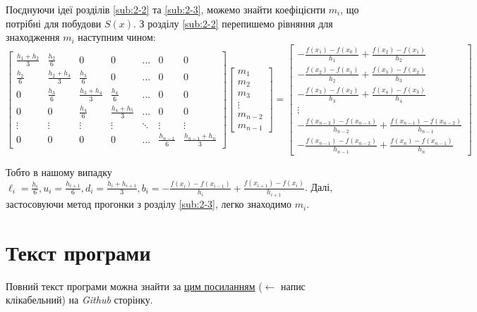 \documentclass[12pt]{extarticle}
\begin{document}
Поєднуючи ідеї розділів \ref{sub:2-2} та \ref{sub:2-3}, можемо знайти коефіцієнти $m_i$, що потрібні для побудови $S(x)$. З розділу \ref{sub:2-2} перепишемо рівняння для знаходження $m_i$ наступним чином:
\[
\begin{bmatrix}
    \frac{h_1+h_2}{3} & \frac{h_2}{6} & 0 & 0 & \dots & 0 & 0 
    \\
    \frac{h_2}{6} & \frac{h_2+h_3}{3} & \frac{h_3}{6} & 0 & \dots & 0 & 0 \\
    0 & \frac{h_3}{6} & \frac{h_3+h_4}{3} & \frac{h_4}{6} & \dots & 0 & 0 \\
    0 & 0 & \frac{h_4}{6} & \frac{h_4+h_5}{3} & \dots & 0 & 0 \\
    \vdots & \vdots & \vdots & \vdots & \ddots & \vdots & \vdots \\
    0 & 0 & 0 & 0 & \dots & \frac{h_{n-1}}{6} & \frac{h_{n-1}+h_n}{3}
\end{bmatrix}\begin{bmatrix}
    m_1 \\ m_2 \\ m_3 \\ \vdots \\ m_{n-2} \\ m_{n-1}
\end{bmatrix} = \begin{bmatrix}
    -\frac{f(x_1)-f(x_0)}{h_1} + \frac{f(x_2)-f(x_1)}{h_2} \\ 
    -\frac{f(x_2)-f(x_1)}{h_2} + \frac{f(x_3)-f(x_2)}{h_3} \\
    -\frac{f(x_3)-f(x_2)}{h_3} + \frac{f(x_4)-f(x_3)}{h_4} \\
    \vdots \\ 
    -\frac{f(x_{n-2})-f(x_{n-3})}{h_{n-2}} + \frac{f(x_{n-1})-f(x_{n-2})}{h_{n-1}} \\
    -\frac{f(x_{n-1})-f(x_{n-2})}{h_{n-1}} + \frac{f(x_{n})-f(x_{n-1})}{h_{n}}
\end{bmatrix}
\]

Тобто в нашому випадку $\ell_i = \frac{h_i}{6}, u_i = \frac{h_{i+1}}{6}, d_i = \frac{h_i+h_{i+1}}{3},b_i = -\frac{f(x_i)-f(x_{i-1})}{h_i} + \frac{f(x_{i+1})-f(x_i)}{h_{i+1}}$. Далі, застосовуючи метод прогонки з розділу \ref{sub:2-3}, легко знаходимо $m_i$.

\pagebreak
\section{Текст програми}

Повний текст програми можна знайти за \href{https://github.com/ZamDimon/University-Homeworks/tree/main/Term%205/Numerical%20Analysis/code/lab_2}{цим посиланням} ($\leftarrow$ напис клікабельний) на \textit{Github} сторінку.
\end{document}
